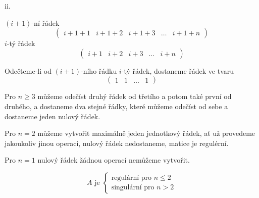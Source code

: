 \documentclass[10pt,a4paper]{article}
\begin{document}
\hfill

ii.

$(i+1)$-ní řádek
\begin{equation*}
\begin{pmatrix}
i+1+1 & i+1+2 & i+1+3 & \hdots & i+1+n
\end{pmatrix}
\end{equation*}
$i$-tý řádek
\begin{equation*}
\begin{pmatrix}
i+1 & i+2 & i+3 & \hdots & i+n
\end{pmatrix}
\end{equation*}

Odečteme-li od $(i+1)$-ního řádku $i$-tý řádek, dostaneme řádek ve tvaru
\begin{equation*}
\begin{pmatrix}
1 & 1 & \hdots & 1
\end{pmatrix}
\end{equation*}

Pro $n \geq 3$ můžeme odečíst druhý řádek od třetího a potom také první od druhého, a dostaneme dva stejné řádky, které můžeme odečíst od sebe a dostaneme jeden nulový řádek.

Pro $n = 2$ můžeme vytvořit maximálně jeden jednotkový řádek, ať už provedeme jakoukoliv jinou operaci, nulový řádek nedostaneme, matice je regulérní.

Pro $n = 1$ nulový řádek žádnou operací nemůžeme vytvořit.

\begin{equation*}
A \text{ je } \begin{cases} 
\text{regulární pro } n \leq 2\\
\text{singulární pro } n > 2
\end{cases}
\end{equation*}
\end{document}
